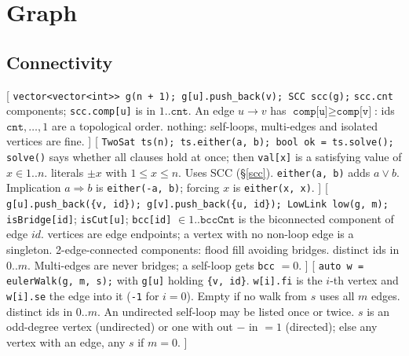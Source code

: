 \section{Graph}
\threelevels
{}

\subsection{Connectivity}
[
	 \texttt{vector<vector<int>> g(n + 1); g[u].push\_back(v); SCC scc(g);}
	 \texttt{scc.cnt} components; \texttt{scc.comp[u]} is in $1..\texttt{cnt}$.
	An edge $u \to v$ has $\texttt{comp[u]} \ge \texttt{comp[v]}$: ids $\texttt{cnt}, \dots, 1$ are a topological order.
	 nothing: self-loops, multi-edges and isolated vertices are fine.
]\label{scc}
[
	 \texttt{TwoSat ts(n); ts.either(a, b); bool ok = ts.solve();}
	 \texttt{solve()} says whether all clauses hold at once; then \texttt{val[x]} is a satisfying value of $x \in 1..n$.
	 literals $\pm x$ with $1 \le x \le n$. Uses SCC (\S\ref{scc}).
	 \texttt{either(a, b)} adds $a \lor b$. Implication $a \Rightarrow b$ is \texttt{either(-a, b)}; forcing $x$ is \texttt{either(x, x)}.
]\label{2sat}
[
	 \texttt{g[u].push\_back(\{v, id\}); g[v].push\_back(\{u, id\}); LowLink low(g, m);}
	 \texttt{isBridge[id]}; \texttt{isCut[u]}; \texttt{bcc[id]} $\in 1..\texttt{bccCnt}$ is the biconnected component of edge $id$.
	 vertices are edge endpoints; a vertex with no non-loop edge is a singleton. 2-edge-connected components: flood fill avoiding bridges.
	 distinct ids in $0..m$. Multi-edges are never bridges; a self-loop gets \texttt{bcc} $= 0$.
]\label{lowlink}
[
	 \texttt{auto w = eulerWalk(g, m, s);} with \texttt{g[u]} holding \texttt{\{v, id\}}.
	 \texttt{w[i].fi} is the $i$-th vertex and \texttt{w[i].se} the edge into it (\texttt{-1} for $i = 0$). Empty if no walk from $s$ uses all $m$ edges.
	 distinct ids in $0..m$. An undirected self-loop may be listed once or twice.
	 $s$ is an odd-degree vertex (undirected) or one with out $-$ in $= 1$ (directed); else any vertex with an edge, any $s$ if $m = 0$.
]\label{euler}


